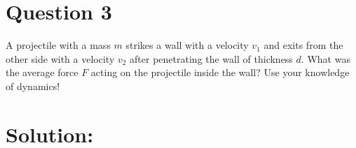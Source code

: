 \section*{Question 3}
A projectile with a mass $m$ strikes a wall with a velocity $v_1$ and exits from the other side with a velocity $v_2$ after penetrating the wall of thickness $d$. What was the average force $F$ acting on the projectile inside the wall? Use your knowledge of dynamics!

\section*{Solution:}